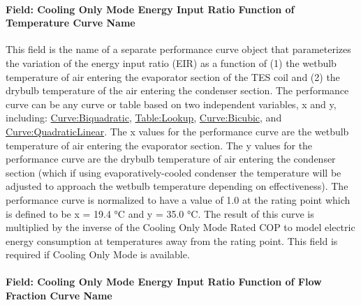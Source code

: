\paragraph{Field: Cooling Only Mode Energy Input Ratio Function of Temperature Curve Name}\label{field-cooling-only-mode-energy-input-ratio-function-of-temperature-curve-name}

This field is the name of a separate performance curve object that parameterizes the variation of the energy input ratio (EIR) as a function of (1) the wetbulb temperature of air entering the evaporator section of the TES coil and (2) the drybulb temperature of the air entering the condenser section. The performance curve can be any curve or table based on two independent variables, x and y, including: \hyperref[curvebiquadratic]{Curve:Biquadratic}, \hyperref[tablelookup]{Table:Lookup}, \hyperref[curvebicubic]{Curve:Bicubic}, and \hyperref[curvequadraticlinear]{Curve:QuadraticLinear}. The x values for the performance curve are the wetbulb temperature of air entering the evaporator section. The y values for the performance curve are the drybulb temperature of air entering the condenser section (which if using evaporatively-cooled condenser the temperature will be adjusted to approach the wetbulb temperature depending on effectiveness). The performance curve is normalized to have a value of 1.0 at the rating point which is defined to be x = 19.4 °C and y = 35.0 °C. The result of this curve is multiplied by the inverse of the Cooling Only Mode Rated COP to model electric energy consumption at temperatures away from the rating point. This field is required if Cooling Only Mode is available.

\paragraph{Field: Cooling Only Mode Energy Input Ratio Function of Flow Fraction Curve Name}\label{field-cooling-only-mode-energy-input-ratio-function-of-flow-fraction-curve-name}

